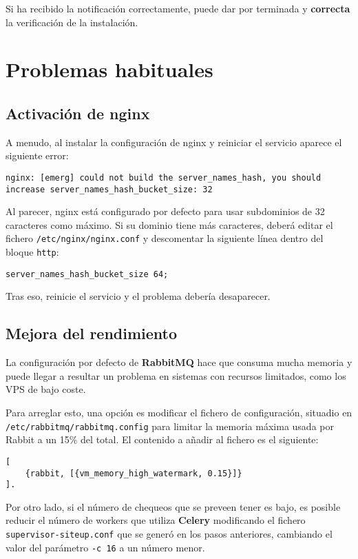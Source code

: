 Si ha recibido la notificación correctamente, puede dar por terminada y
\textbf{correcta} la verificación de la instalación.

\section{Problemas habituales}

\subsection{Activación de nginx}

A menudo, al instalar la configuración de nginx y reiniciar el servicio aparece el siguiente error:

\begin{verbatim}
nginx: [emerg] could not build the server_names_hash, you should increase server_names_hash_bucket_size: 32
\end{verbatim}

Al parecer, nginx está configurado por defecto para usar subdominios de 32
caracteres como máximo. Si su dominio tiene más caracteres, deberá editar el
fichero \texttt{/etc/nginx/nginx.conf} y descomentar la siguiente línea dentro
del bloque \texttt{http}:

\begin{verbatim}
server_names_hash_bucket_size 64;
\end{verbatim}

Tras eso, reinicie el servicio y el problema debería desaparecer.



\subsection{Mejora del rendimiento}

La configuración por defecto de \textbf{RabbitMQ} hace que consuma mucha memoria
y puede llegar a resultar un problema en sistemas con recursos limitados, como
los VPS de bajo coste.

Para arreglar esto, una opción es modificar el fichero de configuración,
situadio en \texttt{/etc/rabbitmq/rabbitmq.config} para limitar la memoria
máxima usada por Rabbit a un 15\% del total. El contenido a añadir al fichero es
el siguiente:

\begin{verbatim}
[
    {rabbit, [{vm_memory_high_watermark, 0.15}]}
].  
\end{verbatim}

Por otro lado, si el número de chequeos que se preveen tener es bajo, es posible
reducir el número de workers que utiliza \textbf{Celery} modificando el fichero
\texttt{supervisor-siteup.conf} que se generó en los pasos anteriores, cambiando
el valor del parámetro \texttt{-c 16} a un número menor.


